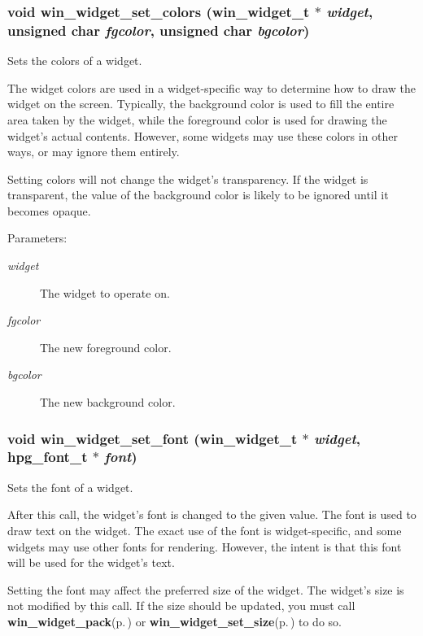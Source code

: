 \subsubsection{\setlength{\rightskip}{0pt plus 5cm}void win\_\-widget\_\-set\_\-colors ({\bf win\_\-widget\_\-t} $\ast$ {\em widget}, unsigned char {\em fgcolor}, unsigned char {\em bgcolor})}\label{winwidget_8h_a13}


Sets the colors of a widget. 

The widget colors are used in a widget-specific way to determine how to draw the widget on the screen. Typically, the background color is used to fill the entire area taken by the widget, while the foreground color is used for drawing the widget's actual contents. However, some widgets may use these colors in other ways, or may ignore them entirely.

Setting colors will not change the widget's transparency. If the widget is transparent, the value of the background color is likely to be ignored until it becomes opaque.

\begin{Desc}
\item[Parameters:]
\begin{description}
\item[{\em widget}]The widget to operate on. \item[{\em fgcolor}]The new foreground color. \item[{\em bgcolor}]The new background color. \end{description}
\end{Desc}
\subsubsection{\setlength{\rightskip}{0pt plus 5cm}void win\_\-widget\_\-set\_\-font ({\bf win\_\-widget\_\-t} $\ast$ {\em widget}, hpg\_\-font\_\-t $\ast$ {\em font})}\label{winwidget_8h_a15}


Sets the font of a widget. 

After this call, the widget's font is changed to the given value. The font is used to draw text on the widget. The exact use of the font is widget-specific, and some widgets may use other fonts for rendering. However, the intent is that this font will be used for the widget's text.

Setting the font may affect the preferred size of the widget. The widget's size is not modified by this call. If the size should be updated, you must call {\bf win\_\-widget\_\-pack}{\rm (p.\,\pageref{winwidget_8h_a12})} or {\bf win\_\-widget\_\-set\_\-size}{\rm (p.\,\pageref{winwidget_8h_a10})} to do so.

